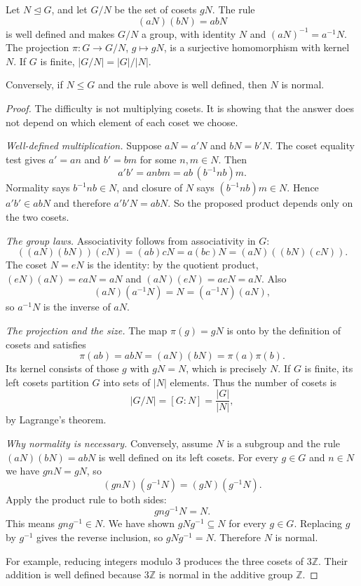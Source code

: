 \begin{theorem}\label{thm:quotient}
Let $N\trianglelefteq G$, and let $G/N$ be the set of cosets $gN$. The rule
\[
(aN)(bN)=abN
\]
is well defined and makes $G/N$ a group, with identity $N$ and $(aN)^{-1}=a^{-1}N$. The projection $\pi:G\to G/N$, $g\mapsto gN$, is a surjective homomorphism with kernel $N$. If $G$ is finite, $|G/N|=|G|/|N|$.

Conversely, if $N\le G$ and the rule above is well defined, then $N$ is normal.
\end{theorem}
\begin{proof}
The difficulty is not multiplying cosets. It is showing that the answer
does not depend on which element of each coset we choose.

\emph{Well-defined multiplication.}
Suppose $aN=a'N$ and $bN=b'N$. The coset equality test gives
$a'=an$ and $b'=bm$ for some $n,m\in N$. Then
\[
a'b'=anbm=ab\,(b^{-1}nb)m.
\]
Normality says $b^{-1}nb\in N$, and closure of $N$ says
$(b^{-1}nb)m\in N$. Hence $a'b'\in abN$ and therefore
$a'b'N=abN$. So the proposed product depends only on the two cosets.

\emph{The group laws.}
Associativity follows from associativity in $G$:
\[
((aN)(bN))(cN)=(ab)cN=a(bc)N=(aN)((bN)(cN)).
\]
The coset $N=eN$ is the identity: by the quotient product,
$(eN)(aN)=eaN=aN$ and $(aN)(eN)=aeN=aN$.
Also
\[
(aN)(a^{-1}N)=N=(a^{-1}N)(aN),
\]
so $a^{-1}N$ is the inverse of $aN$.

\emph{The projection and the size.}
The map $\pi(g)=gN$ is onto by the definition of cosets and satisfies
\[
\pi(ab)=abN=(aN)(bN)=\pi(a)\pi(b).
\]
Its kernel consists of those $g$ with $gN=N$, which is precisely $N$.
If $G$ is finite, its left cosets partition $G$ into sets of $|N|$
elements. Thus the number of cosets is
\[
|G/N|=[G:N]=\frac{|G|}{|N|},
\]
by Lagrange's theorem.

\emph{Why normality is necessary.}
Conversely, assume $N$ is a subgroup and the rule
$(aN)(bN)=abN$ is well defined on its left cosets. For every
$g\in G$ and $n\in N$ we have $gnN=gN$, so
\[
(gnN)(g^{-1}N)=(gN)(g^{-1}N).
\]
Apply the product rule to both sides:
\[
gng^{-1}N=N.
\]
This means $gng^{-1}\in N$. We have shown $gNg^{-1}\subseteq N$
for every $g\in G$. Replacing $g$ by $g^{-1}$ gives the reverse
inclusion, so $gNg^{-1}=N$. Therefore $N$ is normal.

For example, reducing integers modulo $3$ produces the three cosets
of $3\mathbb Z$. Their addition is well defined because $3\mathbb Z$
is normal in the additive group $\mathbb Z$.
\end{proof}


